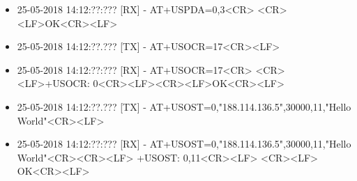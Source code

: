 \begin{itemize}
	\item 25-05-2018 14:12:??:??? [RX] - AT+USPDA=0,3<CR> \newline <CR><LF>\newline OK<CR><LF>
	\item 25-05-2018 14:12:??.??? [TX] - AT+USOCR=17<CR><LF>
	\item 25-05-2018 14:12:??:??? [RX] - AT+USOCR=17<CR> \newline <CR><LF>\newline +USOCR: 0<CR><LF>\newline <CR><LF>\newline OK<CR><LF>
	\item 25-05-2018 14:12:??.??? [TX] - AT+USOST=0,"188.114.136.5",30000,11,"Hello World"<CR><LF>
	\item 25-05-2018 14:12:??:??? [RX] - AT+USOST=0,"188.114.136.5",30000,11,"Hello World"<CR>\newline <CR><LF> \newline +USOST: 0,11<CR><LF> \newline <CR><LF> \newline OK<CR><LF>
\end{itemize}